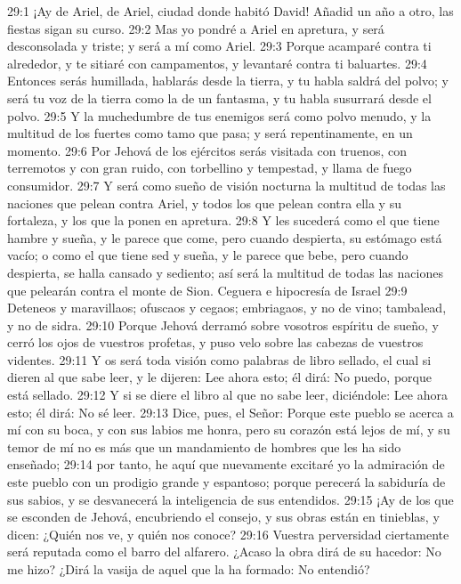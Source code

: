 29:1 ¡Ay de Ariel, de Ariel, ciudad donde habitó David! Añadid un año a otro, las fiestas sigan su curso. 
29:2 Mas yo pondré a Ariel en apretura, y será desconsolada y triste; y será a mí como Ariel. 
29:3 Porque acamparé contra ti alrededor, y te sitiaré con campamentos, y levantaré contra ti baluartes. 
29:4 Entonces serás humillada, hablarás desde la tierra, y tu habla saldrá del polvo; y será tu voz de la tierra como la de un fantasma, y tu habla susurrará desde el polvo. 
29:5 Y la muchedumbre de tus enemigos será como polvo menudo, y la multitud de los fuertes como tamo que pasa; y será repentinamente, en un momento. 
29:6 Por Jehová de los ejércitos serás visitada con truenos, con terremotos y con gran ruido, con torbellino y tempestad, y llama de fuego consumidor. 
29:7 Y será como sueño de visión nocturna la multitud de todas las naciones que pelean contra Ariel, y todos los que pelean contra ella y su fortaleza, y los que la ponen en apretura. 
29:8 Y les sucederá como el que tiene hambre y sueña, y le parece que come, pero cuando despierta, su estómago está vacío; o como el que tiene sed y sueña, y le parece que bebe, pero cuando despierta, se halla cansado y sediento; así será la multitud de todas las naciones que pelearán contra el monte de Sion. 
Ceguera e hipocresía de Israel 
29:9 Deteneos y maravillaos; ofuscaos y cegaos; embriagaos, y no de vino; tambalead, y no de sidra. 
29:10 Porque Jehová derramó sobre vosotros espíritu de sueño, y cerró los ojos de vuestros profetas, y puso velo sobre las cabezas de vuestros videntes. 
29:11 Y os será toda visión como palabras de libro sellado, el cual si dieren al que sabe leer, y le dijeren: Lee ahora esto; él dirá: No puedo, porque está sellado. 
29:12 Y si se diere el libro al que no sabe leer, diciéndole: Lee ahora esto; él dirá: No sé leer. 
29:13 Dice, pues, el Señor: Porque este pueblo se acerca a mí con su boca, y con sus labios me honra, pero su corazón está lejos de mí, y su temor de mí no es más que un mandamiento de hombres que les ha sido enseñado; 
29:14 por tanto, he aquí que nuevamente excitaré yo la admiración de este pueblo con un prodigio grande y espantoso; porque perecerá la sabiduría de sus sabios, y se desvanecerá la inteligencia de sus entendidos. 
29:15 ¡Ay de los que se esconden de Jehová, encubriendo el consejo, y sus obras están en tinieblas, y dicen: ¿Quién nos ve, y quién nos conoce? 
29:16 Vuestra perversidad ciertamente será reputada como el barro del alfarero. ¿Acaso la obra dirá de su hacedor: No me hizo? ¿Dirá la vasija de aquel que la ha formado: No entendió? 
